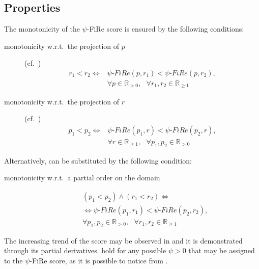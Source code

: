 \documentclass{article}
\newcommand{\fire}{FiRe}
\newcommand{\psifire}{$\psi$-\fire}
\begin{document}
\subsection{Properties}\label{sec:fire-prop}
The monotonicity of the \psifire{} score is ensured by the following conditions:
\begin{description}
	\item[monotonicity w.r.t.\ the projection of $p$] (cf.\ )
	\begin{equation}
		\begin{split}
			r_1 < r_2 \iff &\psi\textrm{-}\fire(p, r_1) < \psi\textrm{-}\fire(p, r_2), \\ &\forall p \in \mathbb{R}_{>0}, ~~~\forall r_1, r_2 \in \mathbb{R}_{\geq1}
		\end{split}\label{eq:projP}
	\end{equation}
	\item[monotonicity w.r.t.\ the projection of $r$] (cf.\ )
	\begin{equation}
		\begin{split}
			p_1 < p_2 \iff &\psi\textrm{-}\fire(p_1, r) < \psi\textrm{-}\fire(p_2, r), \\ &\forall r \in \mathbb{R}_{\geq1}, ~~~\forall p_1, p_2 \in \mathbb{R}_{>0}
		\end{split}\label{eq:projR}
	\end{equation}
\end{description}
%
Alternatively,  can be substituted by the following condition:
%
\begin{description}
	\item[monotonicity w.r.t.\ a partial order on the domain] 
	\begin{equation}
		\begin{split}
			&(p_1 < p_2) \wedge (r_1 < r_2) \iff \\&\iff \psi\textrm{-}\fire(p_1, r_1) < \psi\textrm{-}\fire(p_2, r_2), \\ &\forall p_1, p_2 \in \mathbb{R}_{>0}, ~~~\forall r_1, r_2 \in \mathbb{R}_{\geq1}
		\end{split}\label{eq:partial}
	\end{equation}
\end{description}

The increasing trend of the score may be observed in  and it is demonstrated through its partial derivatives.
%
 hold for any possible $\psi>0$ that may be assigned to the \psifire{} score, as it is possible to notice from .
\end{document}
